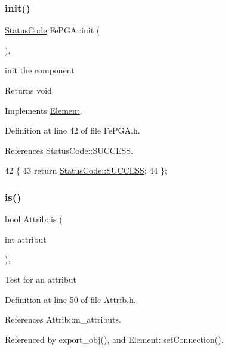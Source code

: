 \subsubsection{\texorpdfstring{init()}{init()}}
{\footnotesize\ttfamily \hyperlink{classStatusCode}{Status\+Code} Fe\+P\+G\+A\+::init (\begin{DoxyParamCaption}{ }\end{DoxyParamCaption})\hspace{0.3cm}{\ttfamily [inline]}, {\ttfamily [virtual]}}

init the component

\begin{DoxyReturn}{Returns}
void 
\end{DoxyReturn}


Implements \hyperlink{classElement_af42754b5cabc198869222725218d695c}{Element}.



Definition at line 42 of file Fe\+P\+G\+A.\+h.



References Status\+Code\+::\+S\+U\+C\+C\+E\+SS.


\begin{DoxyCode}
42                     \{
43     \textcolor{keywordflow}{return} \hyperlink{classStatusCode_a6f565cbeadc76d14c72f047e5e85eb4badd0da38d3ba0d922efd1f4619bc37ad8}{StatusCode::SUCCESS};
44   \};
\end{DoxyCode}
\mbox{\label{classAttrib_a704f26af560909ad22065083bb7d4c34}} 
\subsubsection{\texorpdfstring{is()}{is()}}
{\footnotesize\ttfamily bool Attrib\+::is (\begin{DoxyParamCaption}\item[{int}]{attribut }\end{DoxyParamCaption})\hspace{0.3cm}{\ttfamily [inline]}, {\ttfamily [inherited]}}

Test for an attribut 

Definition at line 50 of file Attrib.\+h.



References Attrib\+::m\+\_\+attributs.



Referenced by export\+\_\+obj(), and Element\+::set\+Connection().


